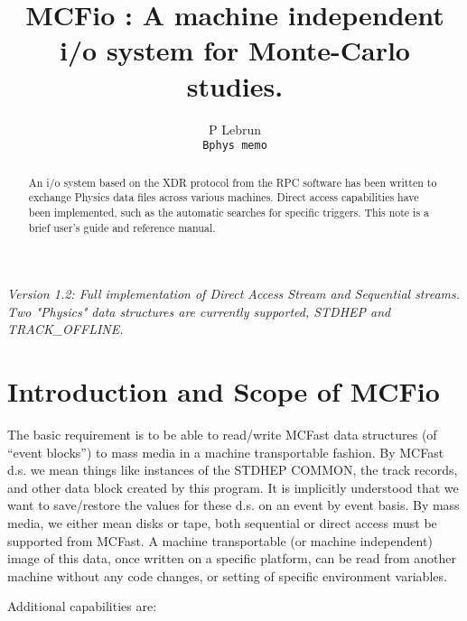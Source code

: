 
\pagestyle{plain}
\title{ MCFio : A machine independent i/o system for Monte-Carlo studies.}  
\author{P Lebrun \\
{\tt Bphys memo}}


\maketitle
 \begin{abstract}
  An i/o system based on the XDR protocol from the RPC software has been 
  written to exchange Physics data files across various machines. 
  Direct access capabilities have been implemented, such as the 
  automatic searches for specific triggers.  This note 
  is a brief user's guide and reference manual.   
\end{abstract}

\vspace{.1in} 
{\em Version 1.2: Full implementation of Direct Access Stream and 
Sequential streams. Two "Physics" data structures 
 are currently supported, STDHEP and TRACK\_OFFLINE.} 



\section{Introduction and Scope of MCFio}

	The basic requirement is to be able to read/write MCFast data
structures (of ``event blocks'')  to mass media in a machine
 transportable fashion.
By MCFast d.s. we mean things like instances of the STDHEP COMMON, 
 the track records, and other data block created by this program. It is 
 implicitly understood that we want to save/restore the values for these 
 d.s. on an event by event basis. By mass media, we either mean disks or 
 tape, both sequential or direct access must be supported from MCFast.
  A machine transportable (or machine  independent) image of this data,
   once written on a specific platform, 
 can be read from another machine without any code changes, or setting 
 of specific environment variables.
 
 	Additional capabilities are:
 	
